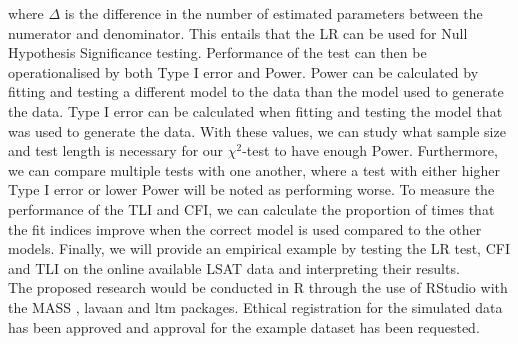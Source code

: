\documentclass{article}
\begin{document}
where $\Delta$ is the difference in the number of estimated parameters between the numerator and denominator. This entails that the LR can be used for Null Hypothesis Significance testing. Performance of the test can then be operationalised by both Type I error and Power. Power can be calculated by fitting and testing a different model to the data than the model used to generate the data. Type I error can be calculated when fitting and testing the model that was used to generate the data. With these values, we can study what sample size and test length is necessary for our $\chi^2$-test to have enough Power. Furthermore, we can compare multiple tests with one another, where a test with either higher Type I error or lower Power will be noted as performing worse. To measure the performance of the TLI and CFI, we can calculate the proportion of times that the fit indices improve when the correct model is used compared to the other models. Finally, we will provide an empirical example by testing the LR test, CFI and TLI on the online available LSAT data and interpreting their results. \\
\indent The proposed research would be conducted in R \autocite{R} through the use of RStudio \autocite{Rstudio} with the MASS \autocite{mass}, lavaan \autocite{lavaan} and ltm \autocite{ltmpack} packages. Ethical registration for the simulated data has been approved and approval for the example dataset has been requested.


\nocite{*}

\newpage
\printbibliography
\end{document}
